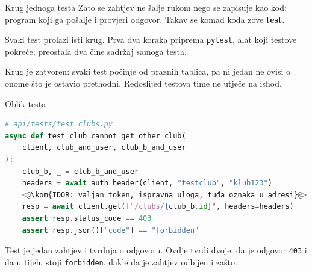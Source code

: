 \begin{frame}{Krug jednoga testa}
Zato se zahtjev ne šalje rukom nego se zapisuje kao kod: program koji ga pošalje i provjeri odgovor. Takav se komad koda zove \textbf{test}.

\vspace{0.6em}
\begin{center}
\end{center}

\vspace{0.9em}
Svaki test prolazi isti krug. Prva dva koraka priprema \texttt{pytest}, alat koji testove pokreće; preostala dva čine sadržaj samoga testa.

\vspace{0.9em}
Krug je zatvoren: svaki test počinje od praznih tablica, pa ni jedan ne ovisi o onome što je ostavio prethodni. Redoslijed testova time ne utječe na ishod.
\end{frame}

\begin{frame}[fragile]{Oblik testa}
\begin{lstlisting}[language=python]
# api/tests/test_clubs.py
async def test_club_cannot_get_other_club(
    client, club_and_user, club_b_and_user
):
    club_b, _ = club_b_and_user
    headers = await auth_header(client, "testclub", "klub123")
    <@\kom{IDOR: valjan token, ispravna uloga, tuđa oznaka u adresi}@>
    resp = await client.get(f"/clubs/{club_b.id}", headers=headers)
    assert resp.status_code == 403
    assert resp.json()["code"] == "forbidden"
\end{lstlisting}

\vspace{0.4em}
Test je jedan zahtjev i tvrdnja o odgovoru. Ovdje tvrdi dvoje: da je odgovor \texttt{403} i da u tijelu stoji \texttt{forbidden}, dakle da je zahtjev odbijen i zašto.
\end{frame}

